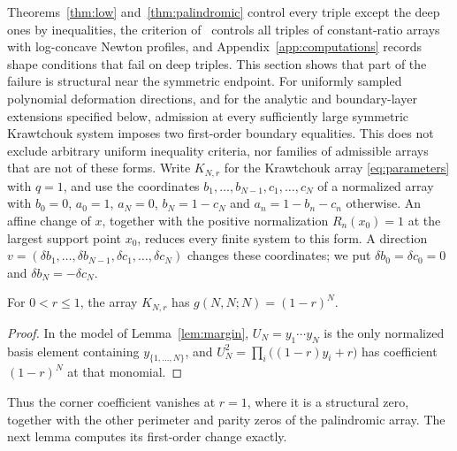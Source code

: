 Theorems~\ref{thm:low} and~\ref{thm:palindromic} control every triple except the deep ones by inequalities, the criterion of~\cite[Theorem~]{P1} controls all triples of constant-ratio arrays with log-concave Newton profiles, and Appendix~\ref{app:computations} records shape conditions that fail on deep triples. This section shows that part of the failure is structural near the symmetric endpoint. For uniformly sampled polynomial deformation directions, and for the analytic and boundary-layer extensions specified below, admission at every sufficiently large symmetric Krawtchouk system imposes two first-order boundary equalities. This does not exclude arbitrary uniform inequality criteria, nor families of admissible arrays that are not of these forms. Write $K_{N,r}$ for the Krawtchouk array \eqref{eq:parameters} with $q=1$, and use the coordinates $b_1,\ldots,b_{N-1},c_1,\ldots,c_N$ of a normalized array with $b_0=0$, $a_0=1$, $a_N=0$, $b_N=1-c_N$ and $a_n=1-b_n-c_n$ otherwise. An affine change of $x$, together with the positive normalization $R_n(x_0)=1$ at the largest support point $x_0$, reduces every finite system to this form. A direction $v=(\delta b_1,\ldots,\delta b_{N-1},\delta c_1,\ldots,\delta c_N)$ changes these coordinates; we put $\delta b_0=\delta c_0=0$ and $\delta b_N=-\delta c_N$.

\begin{lemma}\label{lem:corner-value}
For $0<r\leq1$, the array $K_{N,r}$ has $g(N,N;N)=(1-r)^N$.
\end{lemma}
\begin{proof}
In the model of Lemma~\ref{lem:margin}, $U_N=y_1\cdots y_N$ is the only normalized basis element containing $y_{\{1,\ldots,N\}}$, and $U_N^2=\prod_i\bigl((1-r)y_i+r\bigr)$ has coefficient $(1-r)^N$ at that monomial.
\end{proof}

Thus the corner coefficient vanishes at $r=1$, where it is a structural zero, together with the other perimeter and parity zeros of the palindromic array. The next lemma computes its first-order change exactly.

